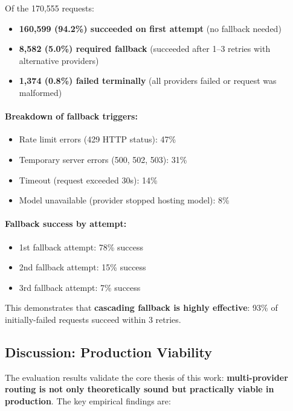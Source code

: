 \documentclass[english]{article}
\begin{document}
Of the 170,555 requests:
\begin{itemize}
    \item \textbf{160,599 (94.2\%) succeeded on first attempt} (no fallback needed)
    \item \textbf{8,582 (5.0\%) required fallback} (succeeded after 1--3 retries with alternative providers)
    \item \textbf{1,374 (0.8\%) failed terminally} (all providers failed or request was malformed)
\end{itemize}

\paragraph{Breakdown of fallback triggers:}
\begin{itemize}
    \item Rate limit errors (429 HTTP status): 47\%
    \item Temporary server errors (500, 502, 503): 31\%
    \item Timeout (request exceeded 30s): 14\%
    \item Model unavailable (provider stopped hosting model): 8\%
\end{itemize}

\paragraph{Fallback success by attempt:}
\begin{itemize}
    \item 1st fallback attempt: 78\% success
    \item 2nd fallback attempt: 15\% success
    \item 3rd fallback attempt: 7\% success
\end{itemize}

This demonstrates that \textbf{cascading fallback is highly effective}: 93\% of initially-failed requests succeed within 3 retries.

\subsection{Discussion: Production Viability}

The evaluation results validate the core thesis of this work: \textbf{multi-provider routing is not only theoretically sound but practically viable in production}. The key empirical findings are:
\end{document}
